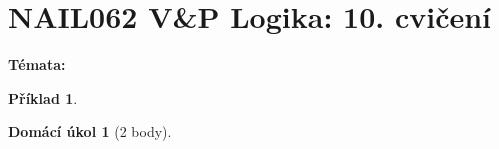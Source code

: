 \documentclass[a4paper]{article}
\theoremstyle{definition}
\newtheorem{problem}{Příklad}
\newtheorem*{ukol}{Domácí úkol}
\begin{document}
\section*{NAIL062 V\&P Logika: 10. cvičení}


\textbf{Témata:}



\medskip\begin{problem}
 
\end{problem}


\medskip\begin{ukol}[2 body]

\end{ukol}
\end{document}
